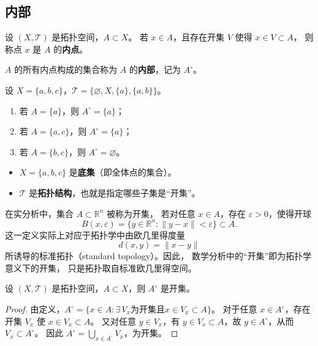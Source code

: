 \subsection{内部}
\begin{definition}
设 $(X,\mathcal{T})$ 是拓扑空间，$A\subset X$。  
若 $x\in A$，且存在开集 $V$ 使得 $x\in V\subset A$，  
则称点 $x$ 是 $A$ 的\textbf{内点}。  

$A$ 的所有内点构成的集合称为 $A$ 的\textbf{内部}，记为 $A^{\circ}$。
\end{definition}
\begin{example}
设 $X=\{a,b,c\}$，$\mathcal{T}=\{\varnothing,X,\{a\},\{a,b\}\}$。
\begin{enumerate}[(1)]
  \item 若 $A=\{a\}$，则 $A^{\circ}=\{a\}$；
  \item 若 $A=\{a,c\}$，则 $A^{\circ}=\{a\}$；
  \item 若 $A=\{b,c\}$，则 $A^{\circ}=\varnothing$。
\end{enumerate}
\end{example}
\begin{itemize}
  \item \( X = \{a,b,c\} \) 是\textbf{底集}（即全体点的集合）。
  \item \( \mathcal{T} \) 是\textbf{拓扑结构}，也就是指定哪些子集是“开集”。
\end{itemize}
\begin{remark}
在实分析中，集合 \(A \subset \mathbb{R}^n\) 被称为开集，
若对任意 \(x \in A\)，存在 \(\varepsilon > 0\)，使得开球
\[
B(x,\varepsilon) = \{y \in \mathbb{R}^n : \|y - x\| < \varepsilon\} \subset A.
\]
这一定义实际上对应于拓扑学中由欧几里得度量
\[
d(x,y) = \|x - y\|
\]
所诱导的标准拓扑（standard topology）。因此，
数学分析中的“开集”即为拓扑学意义下的开集，
只是拓扑取自标准欧几里得空间。
\end{remark}
\begin{theorem}[内部都是开集]
设 $(X,\mathcal{T})$ 是拓扑空间，$A\subset X$，则 $A^{\circ}$ 是开集。
\end{theorem}

\begin{proof}
由定义，$A^{\circ}=\{x\in A:\exists\,V_x\text{为开集且}x\in V_x\subset A\}$。  
对于任意 $x\in A^{\circ}$，存在开集 $V_x$ 使 $x\in V_x\subset A$。  
又对任意 $y\in V_x$，有 $y\in V_x\subset A$，故 $y\in A^{\circ}$，从而 $V_x\subset A^{\circ}$。  
因此 $A^{\circ}=\bigcup_{x\in A^{\circ}}V_x$，为开集。
\end{proof}

